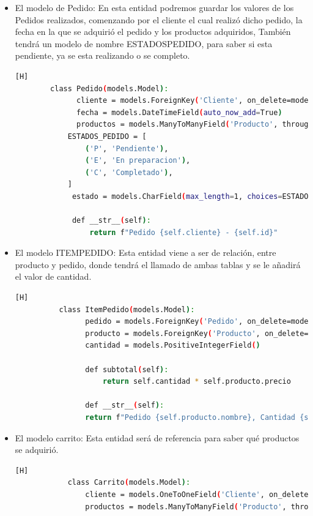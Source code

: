 \documentclass{article}
\begin{document}
\begin{itemize}
\begin{lstlisting}[language=bash,caption={Modelo de clientes}][H]
        def get_absolute_url(self):
            return reverse('cliente-detail', args=[str(self.id)])
	  \end{lstlisting}
		\item El modelo de Pedido: En esta entidad podremos guardar los valores de los Pedidos realizados, comenzando por el cliente el cual realizó dicho pedido, la fecha en la que se adquirió el pedido y los productos adquiridos, También tendrá un modelo de nombre ESTADOSPEDIDO, para saber si esta pendiente, ya se esta realizando o se completo.
        \begin{lstlisting}[language=bash,caption={Modelo de pedido}][H]
		class Pedido(models.Model):
              cliente = models.ForeignKey('Cliente', on_delete=models.CASCADE)
              fecha = models.DateTimeField(auto_now_add=True)
              productos = models.ManyToManyField('Producto', through='ItemPedido')
            ESTADOS_PEDIDO = [
                ('P', 'Pendiente'),
                ('E', 'En preparacion'),
                ('C', 'Completado'),
            ]
             estado = models.CharField(max_length=1, choices=ESTADOS_PEDIDO, default='P')

             def __str__(self):
                 return f"Pedido {self.cliente} - {self.id}"

	  \end{lstlisting}
		\item El modelo ITEMPEDIDO: Esta entidad viene a ser de relación, entre producto y pedido, donde tendrá el llamado de ambas tablas y se le añadirá el valor de cantidad.
        \begin{lstlisting}[language=bash,caption={Modelo ITEMPEDIDO}][H]
	      class ItemPedido(models.Model):
                pedido = models.ForeignKey('Pedido', on_delete=models.CASCADE)
                producto = models.ForeignKey('Producto', on_delete=models.CASCADE)
                cantidad = models.PositiveIntegerField()

                def subtotal(self):
                    return self.cantidad * self.producto.precio

                def __str__(self):
                return f"Pedido {self.producto.nombre}, Cantidad {self.cantidad}, Precio unitario {self.producto.precio}"
	  \end{lstlisting}
        \item El modelo carrito: Esta entidad será de referencia para saber qué productos se adquirió.
        \begin{lstlisting}[language=bash,caption={Modelo de carrio}][H]
		    class Carrito(models.Model):
                cliente = models.OneToOneField('Cliente', on_delete=models.CASCADE)
                productos = models.ManyToManyField('Producto', through='ItemCarrito')


\end{lstlisting}
\end{itemize}
\end{document}
